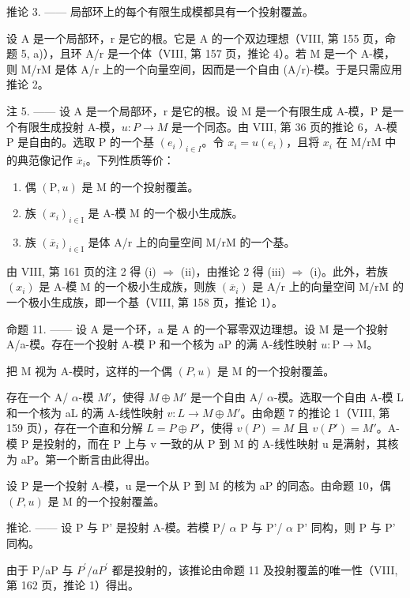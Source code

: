 推论 3. —— 局部环上的每个有限生成模都具有一个投射覆盖。

设 A 是一个局部环，r 是它的根。它是 A 的一个双边理想（VIII, 第 155 页，命题 5, a)），且环 A/r 是一个体（VIII, 第 157 页，推论 4）。若 M 是一个 A-模，则 M/rM 是体 A/r 上的一个向量空间，因而是一个自由 (A/r)-模。于是只需应用推论 2。

注 5. —— 设 A 是一个局部环，r 是它的根。设 M 是一个有限生成 A-模，P 是一个有限生成投射 A-模，\(u : P \to M\) 是一个同态。由 VIII, 第 36 页的推论 6，A-模 P 是自由的。选取 P 的一个基 \((e_{i})_{i \in I}\)。令 \(x_{i} = u(e_{i})\)，且将 \(x_{i}\) 在 M/rM 中的典范像记作 \(\overline{x}_{i}\)。下列性质等价：

\begin{enumerate}
\def\labelenumi{(\roman{enumi})}
\item
  偶 \((\mathrm{P},u)\) 是 M 的一个投射覆盖。
\item
  族 \((x_{i})_{i\in \mathrm{I}}\) 是 A-模 M 的一个极小生成族。
\item
  族 \((\overline{x}_{i})_{i\in\mathrm{I}}\) 是体 A/r 上的向量空间 M/rM 的一个基。
\end{enumerate}

由 VIII, 第 161 页的注 2 得 (i) \(\Rightarrow\) (ii)，由推论 2 得 (iii) \(\Rightarrow\) (i)。此外，若族 \((x_{i})\) 是 A-模 M 的一个极小生成族，则族 \((\overline{x}_{i})\) 是 A/r 上的向量空间 M/rM 的一个极小生成族，即一个基（VIII, 第 158 页，推论 1）。

命题 11. —— 设 A 是一个环，a 是 A 的一个幂零双边理想。设 M 是一个投射 A/a-模。存在一个投射 A-模 P 和一个核为 aP 的满 A-线性映射 \(u: \mathrm{P} \to \mathrm{M}\)。

把 M 视为 A-模时，这样的一个偶 \((P,u)\) 是 M 的一个投射覆盖。

存在一个 A/ \(\alpha\)-模 \(M'\)，使得 \(M \oplus M'\) 是一个自由 A/ \(\alpha\)-模。选取一个自由 A-模 L 和一个核为 aL 的满 A-线性映射 \(v: L \to M \oplus M'\)。由命题 7 的推论 1（VIII, 第 159 页），存在一个直和分解 \(L = P \oplus P'\)，使得 \(v(P) = M\) 且 \(v(P') = M'\)。A-模 P 是投射的，而在 P 上与 v 一致的从 P 到 M 的 A-线性映射 u 是满射，其核为 aP。第一个断言由此得出。

设 P 是一个投射 A-模，u 是一个从 P 到 M 的核为 aP 的同态。由命题 10，偶 \((P,u)\) 是 M 的一个投射覆盖。

推论. —— 设 P 与 P' 是投射 A-模。若模 P/ \(\alpha\) P 与 P'/ \(\alpha\) P' 同构，则 P 与 P' 同构。

由于 P/aP 与 \(P^{\prime}/aP^{\prime}\) 都是投射的，该推论由命题 11 及投射覆盖的唯一性（VIII, 第 162 页，推论 1）得出。

